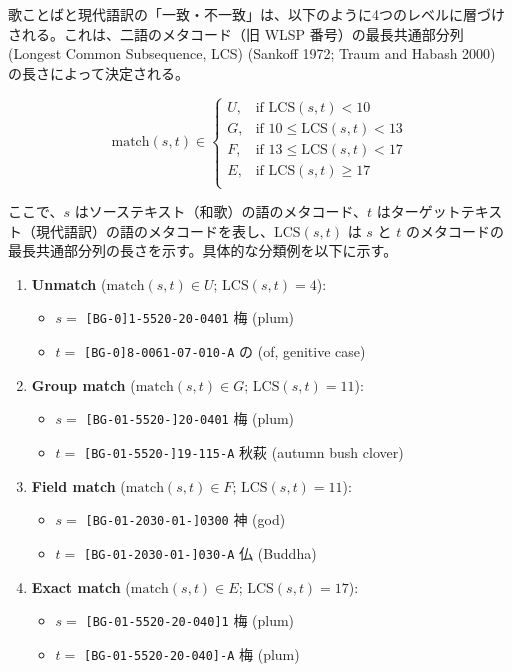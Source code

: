 \documentclass[
  letterpaper,
  DIV=11,
  numbers=noendperiod]{scrartcl}
\providecommand{\tightlist}{%
  \setlength{\itemsep}{0pt}\setlength{\parskip}{0pt}}\usepackage{longtable,booktabs,array}
\begin{document}
歌ことばと現代語訳の「一致・不一致」は、以下のように4つのレベルに層づけされる。これは、二語のメタコード（旧
WLSP 番号）の最長共通部分列 (Longest Common Subsequence, LCS) (Sankoff
1972; Traum and Habash 2000) の長さによって決定される。

\[
\text{match}(s,t) \in
\begin{cases}
U, & \text{if } \text{LCS}(s,t) < 10 \\
G, & \text{if } 10 \leq \text{LCS}(s,t) < 13 \\
F, & \text{if } 13 \leq \text{LCS}(s,t) < 17 \\
E, & \text{if } \text{LCS}(s,t) \geq 17 \\
\end{cases}
\]

ここで、\(s\) はソーステキスト（和歌）の語のメタコード、\(t\)
はターゲットテキスト（現代語訳）の語のメタコードを表し、\(\text{LCS}(s,t)\)
は \(s\) と \(t\)
のメタコードの最長共通部分列の長さを示す。具体的な分類例を以下に示す。

\begin{enumerate}
\def\labelenumi{\arabic{enumi}.}
\tightlist
\item
  \textbf{Unmatch} (\(\text{match}(s,t) \in U\); \(\text{LCS}(s,t)=4\)):

  \begin{itemize}
  \tightlist
  \item
    \(s=\) \texttt{{[}BG-0{]}1-5520-20-0401} 梅 (plum)
  \item
    \(t=\) \texttt{{[}BG-0{]}8-0061-07-010-A} の (of, genitive case)
  \end{itemize}
\item
  \textbf{Group match} (\(\text{match}(s,t) \in G\);
  \(\text{LCS}(s,t)=11\)):

  \begin{itemize}
  \tightlist
  \item
    \(s=\) \texttt{{[}BG-01-5520-{]}20-0401} 梅 (plum)
  \item
    \(t=\) \texttt{{[}BG-01-5520-{]}19-115-A} 秋萩 (autumn bush clover)
  \end{itemize}
\item
  \textbf{Field match} (\(\text{match}(s,t) \in F\);
  \(\text{LCS}(s,t)=11\)):

  \begin{itemize}
  \tightlist
  \item
    \(s=\) \texttt{{[}BG-01-2030-01-{]}0300} 神 (god)
  \item
    \(t=\) \texttt{{[}BG-01-2030-01-{]}030-A} 仏 (Buddha)
  \end{itemize}
\item
  \textbf{Exact match} (\(\text{match}(s,t) \in E\);
  \(\text{LCS}(s,t)=17\)):

  \begin{itemize}
  \tightlist
  \item
    \(s=\) \texttt{{[}BG-01-5520-20-040{]}1} 梅 (plum)
  \item
    \(t=\) \texttt{{[}BG-01-5520-20-040{]}-A} 梅 (plum)
  \end{itemize}
\end{enumerate}
\end{document}
